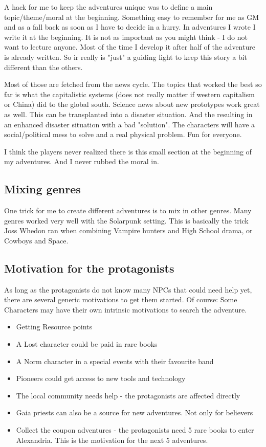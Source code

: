 A hack for me to keep the adventures unique was to define a main topic/theme/moral at the beginning. Something easy to remember for me as GM and as a fall back as soon as I have to decide in a hurry.
In adventures I wrote I write it at the beginning. It is not as important as you might think - I do not want to lecture anyone. Most of the time I develop it after half of the adventure is already written. So ir really is "just" a guiding light to keep this story a bit different than the others.

Most of those are fetched from the news cycle. The topics that worked the best so far is what the capitalistic systems (does not really matter if western capitalism or China) did to the global south. Science news about new prototypes work great as well. This can be transplanted into a disaster situation. And the resulting in an enhanced disaster situation with a bad "solution". The characters will have a social/political mess to solve and a real physical problem. Fun for everyone.

I think the players never realized there is this small section at the beginning of my adventures. And I never rubbed the moral in.

\subsection{Mixing genres}

One trick for me to create different adventures is to mix in other genres. Many genres worked very well with the Solarpunk setting. This is basically the trick Joss Whedon ran when combining Vampire hunters and High School drama, or Cowboys and Space.

\subsection{Motivation for the protagonists}

As long as the protagonists do not know many NPCs that could need help yet, there are several generic motivations to get them started. Of course: Some Characters may have their own intrinsic motivations to search the adventure.

\begin{itemize}
\item{Getting Resource points}
\item{A Lost character could be paid in rare books}
\item{A Norm character in a special events with their favourite band}
\item {Pioneers could get access to new tools and technology}
\item {The local community needs help - the protagonists are affected directly}
\item {Gaia priests can also be a source for new adventures. Not only for believers}
\item{Collect the coupon adventures - the protagonists need 5 rare books to enter Alexandria. This is the motivation for the next 5 adventures.}
\end{itemize}


